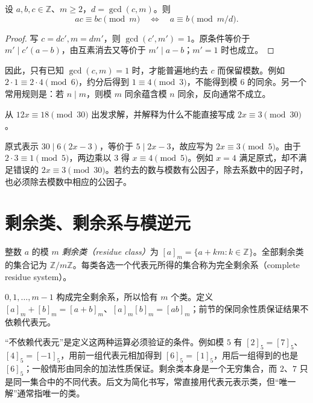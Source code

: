 \begin{proposition}[约分法则]
\label{prop:congruence-cancellation}
设 $a,b,c\in\mathbb Z$、$m\ge2$，$d=\gcd(c,m)$。则
\begin{equation}
 ac\equiv bc\pmod m
 \quad\Longleftrightarrow\quad
 a\equiv b\pmod{m/d}.
 \label{eq:congruence-cancellation}
\end{equation}
\end{proposition}
\begin{proof}
写 $c=dc',m=dm'$，则 $\gcd(c',m')=1$。原条件等价于 $m'\mid c'(a-b)$，由互素消去又等价于 $m'\mid a-b$；$m'=1$ 时也成立。
\end{proof}

因此，只有已知 $\gcd(c,m)=1$ 时，才能普遍地约去 $c$ 而保留模数。例如 $2\cdot1\equiv2\cdot4\pmod6$，约分后得到 $1\equiv4\pmod3$，不能得到模 $6$ 的同余。另一个常用规则是：若 $n\mid m$，则模 $m$ 同余蕴含模 $n$ 同余，反向通常不成立。

\begin{example}[约分同时改变了什么]
从 $12x\equiv18\pmod{30}$ 出发求解，并解释为什么不能直接写成 $2x\equiv3\pmod{30}$。
\end{example}
\begin{solve}
原式表示 $30\mid6(2x-3)$，等价于 $5\mid2x-3$，故应写为 $2x\equiv3\pmod5$。由于 $2\cdot3\equiv1\pmod5$，两边乘以 $3$ 得 $x\equiv4\pmod5$。例如 $x=4$ 满足原式，却不满足错误的 $2x\equiv3\pmod{30}$。若约去的数与模数有公因子，除去系数中的因子时，也必须除去模数中相应的公因子。
\end{solve}

\section{剩余类、剩余系与模逆元}

\begin{definition}
整数 $a$ 的模 $m$ \emph{剩余类（residue class）}为 $[a]_m=\{a+km:k\in\mathbb Z\}$。全部剩余类的集合记为 $\mathbb Z/m\mathbb Z$。每类各选一个代表元所得的集合称为完全剩余系（complete residue system）。
\end{definition}

$0,1,\ldots,m-1$ 构成完全剩余系，所以恰有 $m$ 个类。定义 $[a]_m+[b]_m=[a+b]_m$、$[a]_m[b]_m=[ab]_m$；前节的保同余性质保证结果不依赖代表元。

“不依赖代表元”是定义这两种运算必须验证的条件。例如模 $5$ 有 $[2]_5=[7]_5$、$[4]_5=[-1]_5$，用前一组代表元相加得到 $[6]_5=[1]_5$，用后一组得到的也是 $[6]_5$；一般情形由同余的加法性质保证。剩余类本身是一个无穷集合，而 $2$、$7$ 只是同一集合中的不同代表。后文为简化书写，常直接用代表元表示类，但“唯一解”通常指唯一的类。

